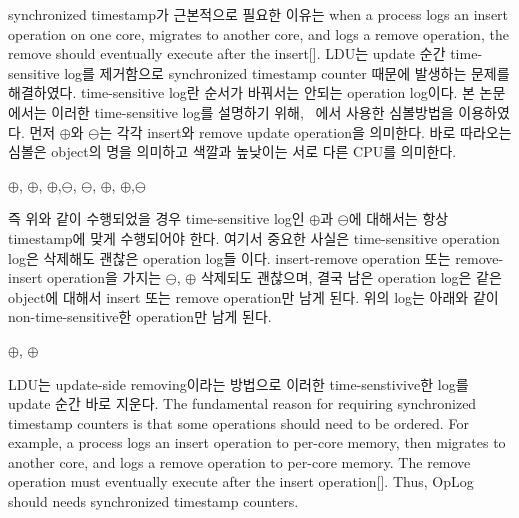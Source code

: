 \ifkor
synchronized timestamp가 근본적으로 필요한 이유는 when a process logs an insert operation
on one core, migrates to another core, and logs a remove operation, the remove
should eventually execute after the insert[].
LDU는 update 순간 time-sensitive log를 제거함으로 synchronized timestamp counter 때문에 발생하는
문제를 해결하였다.
time-sensitive log란 순서가 바꿔서는 안되는 operation log이다. 
본 논문에서는 이러한 time-sensitive log를 설명하기 위해, ~\cite{Clements15SCR}에서 사용한 심볼방법을
이용하였다.
먼저 $\oplus$와 $\ominus$는 각각 insert와 remove update operation을 의미한다.
바로 따라오는 심볼은 object의 명을 의미하고 색깔과 높낮이는 서로 다른 CPU를 의미한다.
\begin{center}
$\oplus$, $\oplus$, $\oplus$,$\ominus$,
$\ominus$, $\oplus$, $\oplus$,$\ominus$
\end{center}
즉 위와 같이 수행되었을 경우 time-sensitive log인 $\oplus$과 $\ominus$에
대해서는 항상 timestamp에 맞게 수행되어야 한다.
여기서 중요한 사실은 time-sensitive operation log은 삭제해도 괜찮은 operation log들 이다.
insert-remove operation 또는 remove-insert operation을 가지는 
$\ominus$, $\oplus$ 삭제되도 괜찮으며, 결국 남은 operation log은 같은
object에 대해서 insert 또는 remove operation만 남게 된다.
위의 log는 아래와 같이 non-time-sensitive한 operation만 남게 된다.
\begin{center}
 $\oplus$, $\oplus$
\end{center}
LDU는 update-side removing이라는 방법으로 이러한 time-senstivive한 log를 update 순간 바로
지운다.
\else
The fundamental reason for requiring synchronized timestamp counters is that 
some operations should need to be ordered.
For example, a process logs an insert operation to per-core memory, then
migrates to another core, and logs a remove operation to per-core memory.
The remove operation must eventually execute after the insert operation[].
Thus, OpLog should needs synchronized timestamp counters.
